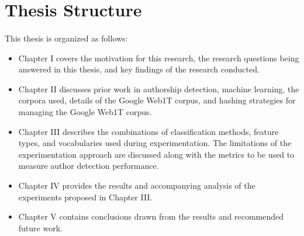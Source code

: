 \section{Thesis Structure}
\paragraph*{} This thesis is organized as follows:
\begin{itemize}
\item Chapter I covers the motivation for this research, the research questions being answered in this thesis, and key findings of the research conducted.
\item Chapter II discusses prior work in authorship detection, machine learning, the corpora used, details of the Google Web1T corpus, and hashing strategies for managing the Google Web1T corpus.
\item Chapter III describes the combinations of classification methods, feature types, and vocabularies used during experimentation.  The limitations of the experimentation approach are discussed along with the metrics to be used to measure author detection performance.
\item Chapter IV provides the results and accompanying analysis of the experiments proposed in Chapter III.
\item Chapter V contains conclusions drawn from the results and recommended future work.
\end{itemize}

